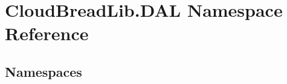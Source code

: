 \hypertarget{a00433}{}\section{Cloud\+Bread\+Lib.\+D\+AL Namespace Reference}
\label{a00433}
\subsection*{Namespaces}
\begin{DoxyCompactItemize}
\end{DoxyCompactItemize}

